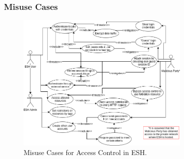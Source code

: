 \documentclass{beamer}
\begin{document}
\begin{frame}
\frametitle{Misuse Cases}

\begin{figure} [ht] 
\begin{center}
\includegraphics[width=0.75\textwidth]{esh_misuse_cases}
\caption{Misuse Cases for Access Control in ESH.}
\label{fig:misuse_cases}
\end{center}
\end{figure}

\end{frame}
\end{document}
